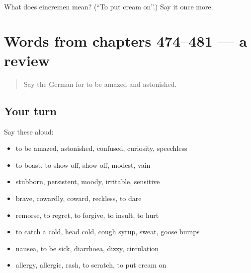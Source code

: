 \begin{tcolorbox}[breakable,colback=teal!4,colframe=teal!35!black,title={Before you move on}]
What does eincremen mean? (\textquotedblleft{}To put cream on\textquotedblright{}.) Say it once more.
\end{tcolorbox}
\section[(dialogue)]{Words from chapters 474–481 — a review}

\label{lesson:GE-R481-review-474-481}



\begin{quote}
Say the German for to be amazed and astonished.
\end{quote}

\subsection*{Your turn}
Say these aloud:

\begin{itemize}
\raggedright
  \item to be amazed, astonished, confused, curiosity, speechless
  \item to boast, to show off, show-off, modest, vain
  \item stubborn, persistent, moody, irritable, sensitive
  \item brave, cowardly, coward, reckless, to dare
  \item remorse, to regret, to forgive, to insult, to hurt
  \item to catch a cold, head cold, cough syrup, sweat, goose bumps
  \item nausea, to be sick, diarrhoea, dizzy, circulation
  \item allergy, allergic, rash, to scratch, to put cream on
\end{itemize}

